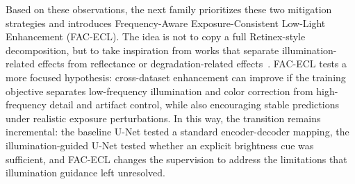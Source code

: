 Based on these observations, the next family prioritizes these two mitigation strategies and introduces Frequency-Aware Exposure-Consistent Low-Light Enhancement (FAC-ECL). The idea is not to copy a full Retinex-style decomposition, but to take inspiration from works that separate illumination-related effects from reflectance or degradation-related effects~\cite{DBLP:conf/bmvc/WeiWY018,DBLP:journals/dsp/WeiLL24}. FAC-ECL tests a more focused hypothesis: cross-dataset enhancement can improve if the training objective separates low-frequency illumination and color correction from high-frequency detail and artifact control, while also encouraging stable predictions under realistic exposure perturbations. In this way, the transition remains incremental: the baseline U-Net tested a standard encoder-decoder mapping, the illumination-guided U-Net tested whether an explicit brightness cue was sufficient, and FAC-ECL changes the supervision to address the limitations that illumination guidance left unresolved.